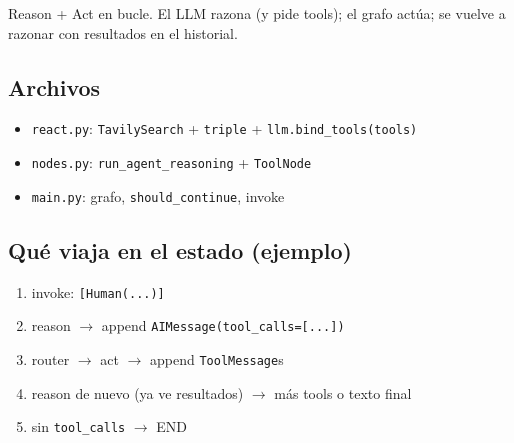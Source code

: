 \documentclass[11pt,a4paper]{article}
\begin{document}
\begin{concept}[title=Idea]
Reason + Act en bucle. El LLM razona (y pide tools); el grafo actúa; se vuelve a razonar con resultados en el historial.
\end{concept}

\begin{center}
\end{center}

\subsection{Archivos}
\begin{itemize}[leftmargin=*,itemsep=1pt]
  \item \texttt{react.py}: \texttt{TavilySearch} + \texttt{triple} + \texttt{llm.bind\_tools(tools)}
  \item \texttt{nodes.py}: \texttt{run\_agent\_reasoning} + \texttt{ToolNode}
  \item \texttt{main.py}: grafo, \texttt{should\_continue}, invoke
\end{itemize}

\subsection{Qué viaja en el estado (ejemplo)}
\begin{enumerate}[leftmargin=*,itemsep=1pt]
  \item invoke: \texttt{[Human(...)]}
  \item reason $\to$ append \texttt{AIMessage(tool\_calls=[...])}
  \item router $\to$ act $\to$ append \texttt{ToolMessage}s
  \item reason de nuevo (ya ve resultados) $\to$ más tools o texto final
  \item sin \texttt{tool\_calls} $\to$ END
\end{enumerate}
\end{document}
